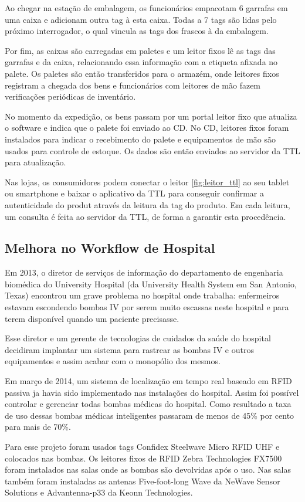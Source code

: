 Ao chegar na estação de embalagem, os funcionários empacotam 6 garrafas em uma caixa e adicionam outra tag à esta caixa. Todas a 7 tags são lidas pelo próximo interrogador, o qual vincula as tags dos frascos à da embalagem.

Por fim, as caixas são carregadas em paletes e um leitor fixos lê as tags das garrafas e da caixa, relacionando essa informação com a etiqueta afixada no palete. Os paletes são então transferidos para o armazém, onde leitores fixos registram a chegada dos bens e funcionários com leitores de mão fazem verificações periódicas de inventário.

No momento da expedição, os bens passam por um portal leitor fixo que atualiza o software e indica que o palete foi enviado ao CD. No CD, leitores fixos foram instalados para indicar o recebimento do palete e equipamentos de mão são usados para controle de estoque. Os dados são então enviados ao servidor da TTL para atualização.

Nas lojas, os consumidores podem conectar o leitor \ref{fig:leitor_ttl} ao seu tablet ou smartphone e baixar o aplicativo da TTL para conseguir confirmar a autenticidade do produt através da leitura da tag do produto. Em cada leitura, um consulta é feita ao servidor da TTL, de forma a garantir esta procedência.


\subsection{Melhora no Workflow de Hospital}
Em 2013, o diretor de serviços de informação do departamento de engenharia biomédica do University Hospital (da University Health System em San Antonio, Texas) encontrou um grave problema no hospital onde trabalha: enfermeiros estavam escondendo bombas IV por serem muito escassas neste hospital e para terem disponível quando um paciente precisasse.

Esse diretor e um gerente de tecnologias de cuidados da saúde do hospital decidiram implantar um sistema para rastrear as bombas IV e outros equipamentos e assim acabar com o monopólio dos mesmos. 

Em março de 2014, um sistema de localização em tempo real baseado em RFID passiva ja havia sido implementado nas instalações do hospital. Assim foi possível controlar e gerenciar todas bombas médicas do hospital. Como resultado a taxa de uso dessas bombas médicas inteligentes passaram de menos de 45\% por cento para mais de 70\%.

Para esse projeto foram usados tags Confidex Steelwave Micro RFID UHF e colocados nas bombas. Os leitores fixos de RFID Zebra Technologies FX7500 foram instalados nas salas onde as bombas são devolvidas após o uso. Nas salas também foram instaladas as antenas Five-foot-long Wave da NeWave Sensor Solutions e Advantenna-p33 da Keonn Technologies.

